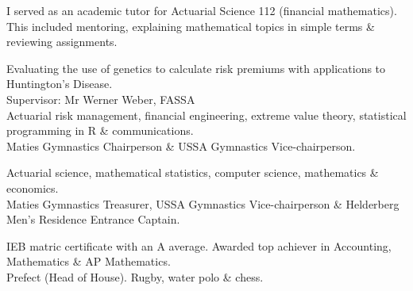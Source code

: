 \documentclass[10pt,a4paper,ragged2e,withhyper]{altacv}
\begin{document}
\begin{paracol}{2}
  \medskip 

  \smallskip
  I served as an academic tutor for Actuarial Science 112 (financial mathematics).\\ This included mentoring, explaining mathematical topics in simple terms \& reviewing assignments. 

  \bigskip 
  

  \smallskip
  \smallskip
  Evaluating the use of genetics to calculate risk premiums with applications to \\Huntington's Disease.\\

  Supervisor: Mr Werner Weber, FASSA\\
  \smallskip
  Actuarial risk management, financial engineering, extreme value theory, statistical programming in R \& communications.\\
  \smallskip
  Maties Gymnastics Chairperson \& USSA Gymnastics Vice-chairperson. 

  \medskip
  \smallskip
  Actuarial science, mathematical statistics, computer science, mathematics \& \\economics.\\
  \smallskip
  Maties Gymnastics Treasurer, USSA Gymnastics Vice-chairperson \& Helderberg Men's Residence Entrance Captain.

  \medskip
  \smallskip
  IEB matric certificate with an A average. Awarded top achiever in Accounting, \\Mathematics \& AP Mathematics.\\
  \smallskip
  Prefect (Head of House). Rugby, water polo \& chess.



\end{paracol}
\end{document}
